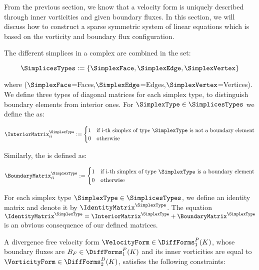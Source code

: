 \newpage
{}
From the previous section, we know that a velocity form is uniquely described through inner vorticities and given boundary fluxes.
In this section, we will discuss how to construct a sparse symmetric system of linear equations which is based on the vorticity
and boundary flux configuration.

The different simplices in a complex are combined in the set:

\begin{equation}
\SimplicesTypes := \{ \SimplexFace,\SimplexEdge,\SimplexVertex \}
\end{equation}

where ($\SimplexFace$=Faces,$\SimplexEdge$=Edges,$\SimplexVertex$=Vertices).
We define three types of diagonal matrices for each simplex type, to distinguish boundary elements from interior ones.
For $\SimplexType \in \SimplicesTypes$ we define the  as:

\begin{equation}
\InteriorMatrix^\SimplexType_{ii} := \begin{cases} 1 & \text{if i-th simplex of type } \SimplexType \text{ is not a boundary element} \\
						  0 & \text{otherwise} \end{cases}
\end{equation}

Similarly, the  is defined as:

\begin{equation}
\BoundaryMatrix^\SimplexType_{ii} := \begin{cases} 1 & \text{if i-th simplex of type } \SimplexType \text{ is a boundary element} \\
						  0 & \text{otherwise} \end{cases}
\end{equation}

For each simplex type $\SimplexType \in \SimplicesTypes$, we define an identity matrix and denote it by $\IdentityMatrix^\SimplexType$.
The equation $\IdentityMatrix^\SimplexType = \InteriorMatrix^\SimplexType + \BoundaryMatrix^\SimplexType$ is an obvious consequence of our defined matrices.

A divergence free velocity form $\VelocityForm \in \DiffForms^P_1(K)$, whose boundary fluxes are
$B_F \in \DiffForms^P_1(K)$ and its inner vorticities are equal to $\VorticityForm \in \DiffForms^D_2(K)$,
satisfies the following constraints:

